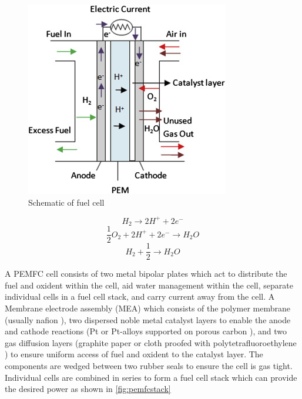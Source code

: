 \begin{figure}[H]
    \centering
    \includegraphics{figures/pemfccell.jpg}
    \caption{Schematic of fuel cell \cite{Dharmalingam2019}}
    \label{fig:pemfccell}
\end{figure}

\begin{equation} \label{pemfcanode}
    H_2 \rightarrow 2H^+ + 2e^-
\end{equation}
\begin{equation} \label{pemfccathode}
    \frac{1}{2}O_2 + 2H^+ + 2e^- \rightarrow H_2 O
\end{equation}
\begin{equation} \label{pemfcall}
    H_2 + \frac{1}{2} \rightarrow H_2O
\end{equation}


 A PEMFC cell consists of two metal bipolar plates which act to distribute the fuel and oxident within the cell, aid water management within the cell, separate individual cells in a fuel cell stack, and carry current away from the cell. \cite{Alaswad2016} A Membrane electrode assembly (MEA) which consists of the polymer membrane (usually nafion \cite{Mehta2003}), two dispersed noble metal catalyst layers to enable the anode and cathode reactions (Pt or Pt-alloys supported on porous carbon \cite{Mehta2003}), and two gas diffusion layers (graphite paper or cloth proofed with polytetrafluoroethylene \cite{Mehta2003}) to ensure uniform access of fuel and oxident to the catalyst layer. The components are wedged between two rubber seals to ensure the cell is gas tight. Individual cells are combined in series to form a fuel cell stack which can provide the desired power as shown in \ref{fig:pemfcstack}

